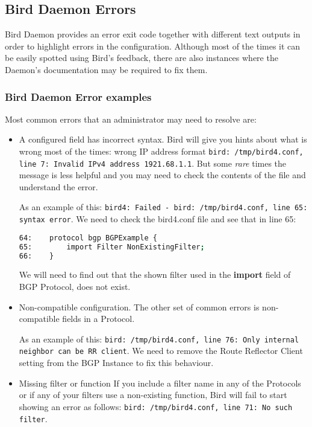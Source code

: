 \subsection{Bird Daemon Errors}
Bird Daemon provides an error exit code together with different text outputs in order to highlight errors in the configuration. Although most of the times it can be easily spotted using Bird's feedback, there are also instances where the Daemon's documentation may be required to fix them.

\subsubsection{Bird Daemon Error examples}
Most common errors that an administrator may need to resolve are:

\begin{itemize}
\item A configured field has incorrect syntax.
Bird will give you hints about what is wrong most of the times: wrong IP address format \texttt{bird: /tmp/bird4.conf, line 7: Invalid IPv4 address 1921.68.1.1}. But some \textit{rare} times the message is less helpful and you may need to check the contents of the file and understand the error.

As an example of this: \texttt{bird4: Failed - bird: /tmp/bird4.conf, line 65: syntax error}. We need to check the bird4.conf file and see that in line 65:

\begin{lstlisting}[language=bash, caption={Bird4.conf contents}]
64:    protocol bgp BGPExample {
65:        import Filter NonExistingFilter;
66:    }
\end{lstlisting}

We will need to find out that the shown filter used in the \textbf{import} field of BGP Protocol, does not exist.

\item Non-compatible configuration.
The other set of common errors is non-compatible fields in a Protocol.

As an example of this: \texttt{bird: /tmp/bird4.conf, line 76: Only internal neighbor can be RR client}. We need to remove the Route Reflector Client setting from the BGP Instance to fix this behaviour.

\item Missing filter or function
If you include a filter name in any of the Protocols or if any of your filters use a non-existing function, Bird will fail to start showing an error as follows: \texttt{bird: /tmp/bird4.conf, line 71: No such filter}.


\end{itemize}
